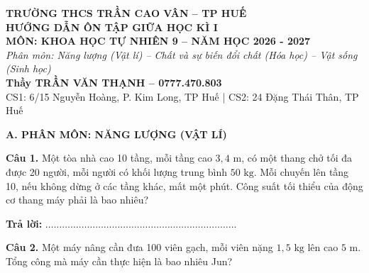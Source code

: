 \documentclass{article}
\begin{document}

\begin{center}
\vspace*{0.6cm}
{\fontsize{24}{30}\selectfont \textbf{TRƯỜNG THCS TRẦN CAO VÂN -- TP HUẾ}}\\[0.6cm]
{\fontsize{36}{44}\selectfont \textbf{\color{brandGreen}HƯỚNG DẪN ÔN TẬP GIỮA HỌC KÌ I}}\\[0.4cm]
{\fontsize{30}{38}\selectfont \textbf{MÔN: KHOA HỌC TỰ NHIÊN 9 -- NĂM HỌC 2026 - 2027}}\\[1.0cm]
{\fontsize{26}{34}\selectfont \textit{Phân môn: Năng lượng (Vật lí) -- Chất và sự biến đổi chất (Hóa học) -- Vật sống (Sinh học)}}\\[1.2cm]
{\fontsize{24}{30}\selectfont \textbf{\color{brandRed}Thầy TRẦN VĂN THẠNH -- 0777.470.803}}\\[0.3cm]
{\fontsize{20}{26}\selectfont CS1: 6/15 Nguyễn Hoàng, P. Kim Long, TP Huế \quad | \quad CS2: 24 Đặng Thái Thân, TP Huế}
\end{center}
\newpage

\fontsize{28}{36}\selectfont
\textbf{\color{brandGreen}A. PHÂN MÔN: NĂNG LƯỢNG (VẬT LÍ)}
\vspace{14pt}

\textbf{Câu 1.} Một tòa nhà cao 10 tầng, mỗi tầng cao $3{,}4\text{ m}$, có một thang chở tối đa được 20 người, mỗi người có khối lượng trung bình $50\text{ kg}$. Mỗi chuyến lên tầng 10, nếu không dừng ở các tầng khác, mất một phút. Công suất tối thiểu của động cơ thang máy phải là bao nhiêu?
\vspace{14pt}

\textbf{Trả lời:} $\dots\dots\dots\dots\dots\dots\dots\dots\dots\dots\dots\dots\dots\dots\dots\dots\dots\dots\dots\dots\dots\dots\dots$
\vspace*{\fill}
\newpage

\fontsize{28}{36}\selectfont
\textbf{Câu 2.} Một máy nâng cần đưa 100 viên gạch, mỗi viên nặng $1{,}5\text{ kg}$ lên cao $5\text{ m}$. Tổng công mà máy cần thực hiện là bao nhiêu Jun?
\vspace{8pt}
\end{document}
